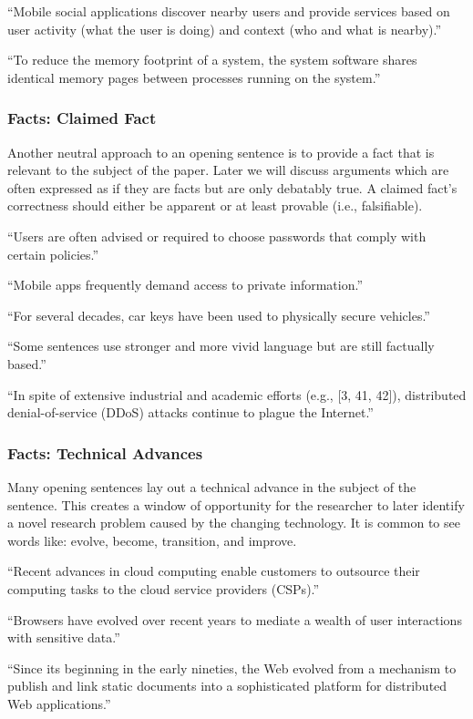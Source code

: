 \documentclass[sigconf]{acmart}
\begin{document}
	``Mobile social applications discover nearby users and provide services based on user activity (what the user is doing) and context (who and what is nearby).''
	
	``To reduce the memory footprint of a system, the system software shares identical memory pages between processes running on the system.''
	
	\subsubsection{Facts: Claimed Fact}
	
	Another neutral approach to an opening sentence is to provide a fact that is relevant to the subject of the paper. Later we will discuss arguments which are often expressed as if they are facts but are only debatably true. A claimed fact’s correctness should either be apparent or at least provable (i.e., falsifiable). 
	
	``Users are often advised or required to choose passwords that comply with certain policies.''
	
	``Mobile apps frequently demand access to private information.''
	
	``For several decades, car keys have been used to physically secure vehicles.''
	
	``Some sentences use stronger and more vivid language but are still factually based.'' 
	
	``In spite of extensive industrial and academic efforts (e.g., [3, 41, 42]), distributed denial-of-service (DDoS) attacks continue to plague the Internet.''
	
	\subsubsection{Facts: Technical Advances}
	
	Many opening sentences lay out a technical advance in the subject of the sentence. This creates a window of opportunity for the researcher to later identify a novel research problem caused by the changing technology.  It is common to see words like: evolve, become, transition, and improve.
	
	``Recent advances in cloud computing enable customers to outsource their computing tasks to the cloud service providers (CSPs).''
	
	``Browsers have evolved over recent years to mediate a wealth of user interactions with sensitive data.''
	
	``Since its beginning in the early nineties, the Web evolved from a mechanism to publish and link static documents into a sophisticated platform for distributed Web applications.''
	
\end{document}
